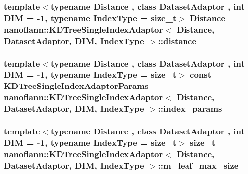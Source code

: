 \hypertarget{classnanoflann_1_1_k_d_tree_single_index_adaptor_a264f86796d4cae73878b594155e9a807}{
\subsubsection[{distance}]{\setlength{\rightskip}{0pt plus 5cm}template$<$typename Distance , class Dataset\-Adaptor , int D\-I\-M = -\/1, typename Index\-Type  = size\-\_\-t$>$ Distance {\bf nanoflann\-::\-K\-D\-Tree\-Single\-Index\-Adaptor}$<$ Distance, Dataset\-Adaptor, D\-I\-M, Index\-Type $>$\-::distance}}\label{classnanoflann_1_1_k_d_tree_single_index_adaptor_a264f86796d4cae73878b594155e9a807}
\hypertarget{classnanoflann_1_1_k_d_tree_single_index_adaptor_a053e2ff7d92476c2201ee4093ade23aa}{
\subsubsection[{index\-\_\-params}]{\setlength{\rightskip}{0pt plus 5cm}template$<$typename Distance , class Dataset\-Adaptor , int D\-I\-M = -\/1, typename Index\-Type  = size\-\_\-t$>$ const {\bf K\-D\-Tree\-Single\-Index\-Adaptor\-Params} {\bf nanoflann\-::\-K\-D\-Tree\-Single\-Index\-Adaptor}$<$ Distance, Dataset\-Adaptor, D\-I\-M, Index\-Type $>$\-::index\-\_\-params\hspace{0.3cm}{\ttfamily [protected]}}}\label{classnanoflann_1_1_k_d_tree_single_index_adaptor_a053e2ff7d92476c2201ee4093ade23aa}
\hypertarget{classnanoflann_1_1_k_d_tree_single_index_adaptor_a8432e2663bddef7a96f034dc10e40727}{
\subsubsection[{m\-\_\-leaf\-\_\-max\-\_\-size}]{\setlength{\rightskip}{0pt plus 5cm}template$<$typename Distance , class Dataset\-Adaptor , int D\-I\-M = -\/1, typename Index\-Type  = size\-\_\-t$>$ size\-\_\-t {\bf nanoflann\-::\-K\-D\-Tree\-Single\-Index\-Adaptor}$<$ Distance, Dataset\-Adaptor, D\-I\-M, Index\-Type $>$\-::m\-\_\-leaf\-\_\-max\-\_\-size\hspace{0.3cm}{\ttfamily [protected]}}}\label{classnanoflann_1_1_k_d_tree_single_index_adaptor_a8432e2663bddef7a96f034dc10e40727}
